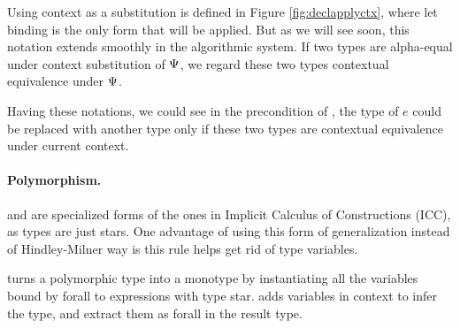 Using context as a substitution is defined in Figure \ref{fig:declapplyctx}, where let binding is the only form that will be applied. But as we will see soon, this notation extends smoothly in the algorithmic system. If two types are alpha-equal under context substitution of $\Psi$, we regard these two types contextual equivalence under $\Psi$.

Having these notations, we could see in the precondition of , the type of $e$ could be replaced with another type only if these two types are contextual equivalence under current context.

\paragraph{Polymorphism.}  and  are specialized forms of the ones in Implicit Calculus of Constructions (ICC), as types are just stars. One advantage of using this form of generalization instead of Hindley-Milner way is this rule helps get rid of type variables.

 turns a polymorphic type into a monotype by instantiating all the variables bound by forall to expressions with type star.  adds variables in context to infer the type, and extract them as forall in the result type.

